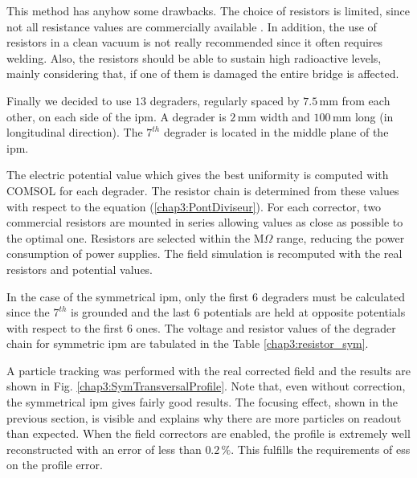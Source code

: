 \begin{refsection}
  

  This method has anyhow some drawbacks. The choice of resistors is limited, since not all resistance values are commercially available \cite{Vishay2012}. In addition, the use of resistors in a clean vacuum is not really recommended since it often requires welding. Also, the resistors should be able to sustain high radioactive levels, mainly considering that, if one of them is damaged the entire bridge is affected.

  Finally we decided to use $13$ degraders, regularly spaced by $7.5\,\mathrm{mm}$ from each other, on each side of the \acrshort{ipm}. A degrader is $2\,\mathrm{mm}$ width and $100\,\mathrm{mm}$ long (in longitudinal direction). The $7^{th}$ degrader is located in the middle plane of the \acrshort{ipm}.

  The electric potential value which gives the best uniformity is computed with COMSOL for each degrader. The resistor chain is determined from these values with respect to the equation (\ref{chap3:PontDiviseur}). For each corrector, two commercial resistors are mounted in series allowing values as close as possible to the optimal one. Resistors are selected within the $\mathrm{M}\Omega $ range, reducing the power consumption of power supplies. The field simulation is recomputed with the real resistors and potential values.

  In the case of the symmetrical \acrshort{ipm}, only the first $6$ degraders must be calculated since the $7^{th}$ is grounded and the last $6$ potentials are held at opposite potentials with respect to  the first 6 ones. The voltage and resistor values of the degrader chain for symmetric \acrshort{ipm} are tabulated in the Table \ref{chap3:resistor_sym}.

  

  A particle tracking was performed with the real corrected field and the results are shown in Fig. \ref{chap3:SymTransversalProfile}. Note that, even without correction, the symmetrical \acrshort{ipm} gives fairly good results. The focusing effect, shown in the previous section, is visible and explains why there are more particles on readout than expected. When the field correctors are enabled, the profile is extremely well reconstructed with an error of less than $0.2\,\mathrm{\%}$.  This fulfills the requirements of \acrshort{ess} on the profile error.

  


\end{refsection}

